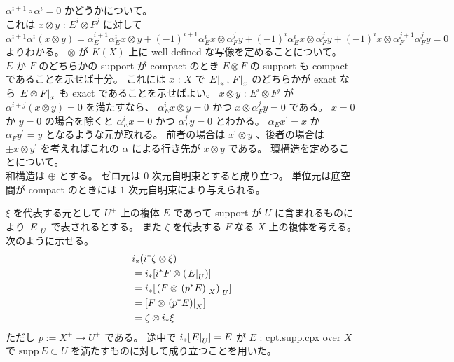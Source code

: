 \documentclass[dvipdfmx]{jsarticle}
\begin{document}
\begin{Proof}[複体のテンソルと環構造]
\itemprof
  \(\alpha^{i+1} \circ \alpha^{i} = 0\) かどうかについて。 \\
  これは \(x \otimes y\) : \(E^i \otimes F^j\) に対して \(\alpha^{i+1} \alpha^i (x \otimes y) = \alpha_E^{i+1} \alpha_E^{i} x \otimes y + (-1)^{i+1} \alpha_E^{i} x \otimes \alpha_F^{j} y + (-1)^{i} \alpha_E^i x \otimes \alpha_F^j y + (-1)^i x \otimes \alpha_F^{j+1} \alpha_F^{j} y = 0\) よりわかる。
\itemprof
  \(\otimes\) が \(K(X)\) 上に well-defined な写像を定めることについて。 \\
  \(E\) か \(F\) のどちらかの support が compact のとき \(E \otimes F\) の support も compact であることを示せば十分。
  これには \(x\) : \(X\) で \(\left. {E} \right| _{x} , \left. {F} \right| _{x}\) のどちらかが exact なら \(\left. {E \otimes F} \right| _{x}\) も exact であることを示せばよい。
  \(x \otimes y\) : \(E^i \otimes F^j\) が \(\alpha^{i+j} (x \otimes y) = 0\) を満たすなら、 \(\alpha_E^i x \otimes y = 0\) かつ \(x \otimes \alpha_F^j y = 0\) である。
  \(x = 0\) か \(y = 0\) の場合を除くと \(\alpha_E^i x = 0\) かつ \(\alpha_F^j y = 0\) とわかる。
  \(\alpha_E x^\prime = x\) か \(\alpha_F y^\prime = y\) となるような元が取れる。
  前者の場合は \(x^\prime \otimes y\) 、後者の場合は \(\pm x \otimes y^\prime\) を考えればこれの \(\alpha\) による行き先が \(x \otimes y\) である。
\itemprof
  環構造を定めることについて。 \\
  和構造は \(\oplus\) とする。
  ゼロ元は \(0\) 次元自明束とすると成り立つ。
  単位元は底空間が compact のときには \(1\) 次元自明束により与えられる。
\end{Proof}

\begin{Proof}[(1) の式]
\itemprof
  \(\xi\) を代表する元として \(U^+\) 上の複体 \(E\) であって support が \(U\) に含まれるものにより \(\left. {E} \right| _{U}\) で表されるとする。
  また \(\zeta\) を代表する \(F\) なる \(X\) 上の複体を考える。
  次のように示せる。
  \begin{align*}
    & i_*(i^* \zeta \otimes \xi) \\
    &=i_* [i^* F \otimes (\left. {E} \right| _{U})] \\
    &=i_* [\left. {(F \otimes \left. {(p^* E)} \right| _{X})} \right| _{U}] \\
    &= [F \otimes \left. {(p^* E)} \right| _{X}] \\
    &= \zeta \otimes i_* \xi
  \end{align*}
  ただし \(p := X^+ \to U^+\) である。
  途中で \(i_*[\left. {E} \right| _{U}] = E\) が \(E\) : cpt.supp.cpx over \(X\) で \(\text{supp} \, E \subset U\) を満たすものに対して成り立つことを用いた。
\end{Proof}
\end{document}
